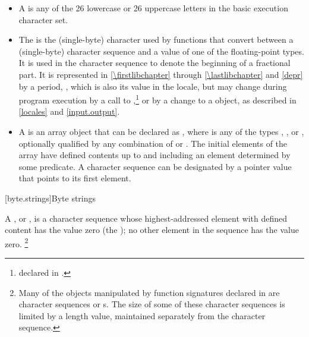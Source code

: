 \begin{itemize}
\item
A  is any of the 26 lowercase or 26
%
%
uppercase letters in the basic execution character set.
\item
The
is the
(single-byte) character used by functions that convert between a (single-byte)
character sequence and a value of one of the floating-point types.
It is used
in the character sequence to denote the beginning of a fractional part.
It is
represented in \ref{\firstlibchapter} through \ref{\lastlibchapter}
and \ref{depr} by a period,
%
,
which is
also its value in the 
locale, but may change during program
execution by a call to
,\footnote{declared in
.
%
%
%
}
or by a change to a
object, as described in \ref{locales} and \ref{input.output}.
\item
A
is an array object  that
can be declared as
,
where  is any of the types
,
,
or
, optionally qualified by any combination of
or
.
The initial elements of the
array have defined contents up to and including an element determined by some
predicate.
A character sequence can be designated by a pointer value
 that points to its first element.
\end{itemize}

[byte.strings]{Byte strings}

%
\pnum
A ,
or \ntbs{},
is a character sequence whose highest-addressed element
with defined content has the value zero
(the );
no other element in the sequence has the value zero.%
%
\footnote{Many of the objects manipulated by
function signatures declared in
 are character sequences or \ntbs{}s.
%
The size of some of these character sequences is limited by
a length value, maintained separately from the character sequence.}

